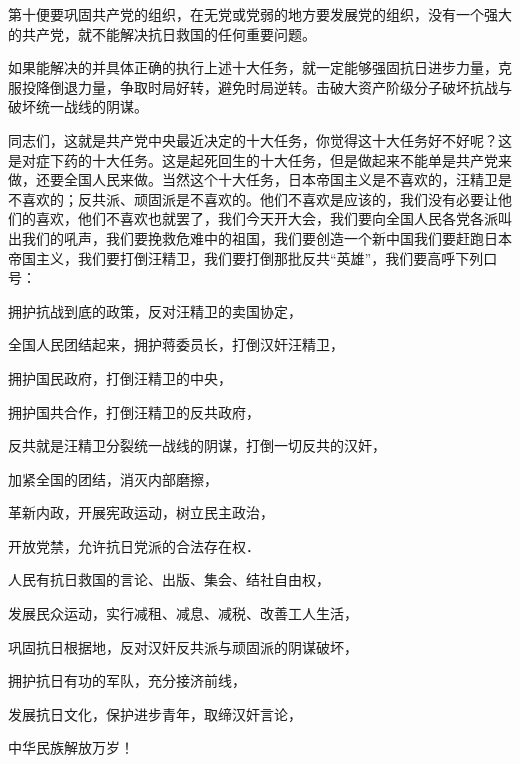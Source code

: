 第十便要巩固共产党的组织，在无党或党弱的地方要发展党的组织，没有一个强大的共产党，就不能解决抗日救国的任何重要问题。

如果能解决的并具体正确的执行上述十大任务，就一定能够强固抗日进步力量，克服投降倒退力量，争取时局好转，避免时局逆转。击破大资产阶级分子破坏抗战与破坏统一战线的阴谋。

同志们，这就是共产党中央最近决定的十大任务，你觉得这十大任务好不好呢？这是对症下药的十大任务。这是起死回生的十大任务，但是做起来不能单是共产党来做，还要全国人民来做。当然这个十大任务，日本帝国主义是不喜欢的，汪精卫是不喜欢的；反共派、顽固派是不喜欢的。他们不喜欢是应该的，我们没有必要让他们的喜欢，他们不喜欢也就罢了，我们今天开大会，我们要向全国人民各党各派叫出我们的吼声，我们要挽救危难中的祖国，我们要创造一个新中国我们要赶跑日本帝国主义，我们要打倒汪精卫，我们要打倒那批反共“英雄”，我们要高呼下列口号：

拥护抗战到底的政策，反对汪精卫的卖国协定，

全国人民团结起来，拥护蒋委员长，打倒汉奸汪精卫，

拥护国民政府，打倒汪精卫的中央，

拥护国共合作，打倒汪精卫的反共政府，

反共就是汪精卫分裂统一战线的阴谋，打倒一切反共的汉奸，

加紧全国的团结，消灭内部磨擦，

革新内政，开展宪政运动，树立民主政治，

开放党禁，允许抗日党派的合法存在权．

人民有抗日救国的言论、出版、集会、结社自由权，

发展民众运动，实行减租、减息、减税、改善工人生活，

巩固抗日根据地，反对汉奸反共派与顽固派的阴谋破坏，

拥护抗日有功的军队，充分接济前线，

发展抗日文化，保护进步青年，取缔汉奸言论，

中华民族解放万岁！

